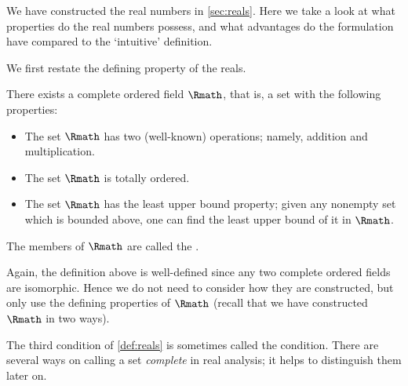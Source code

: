  \label{sec:reals}

We have constructed the real numbers in \cref{sec:reals}.
Here we take a look at what properties do the real numbers possess,
and what advantages do the formulation have
compared to the `intuitive' definition.

We first restate the defining property of the reals.

\begin{definition}
    \label{def:reals}
    There exists a complete ordered field \(\Rmath\),
    that is, a set with the following properties:
    \begin{itemize}
        \item The set \(\Rmath\) has two (well-known) operations;
        namely, addition and multiplication.
        \item The set \(\Rmath\) is totally ordered.
        \item The set \(\Rmath\) has the least upper bound property;
        given any nonempty set which is bounded above,
        one can find the least upper bound of it in \(\Rmath\).
    \end{itemize}
    The members of \(\Rmath\) are called the .
\end{definition}

Again, the definition above is well-defined
since any two complete ordered fields are isomorphic.
Hence we do not need to consider how they are constructed,
but only use the defining properties of \(\Rmath\)
(recall that we have constructed \(\Rmath\) in two ways).

The third condition of \cref{def:reals}
is sometimes called the  condition.
There are several ways on
calling a set \emph{complete} in real analysis;
it helps to distinguish them later on.

